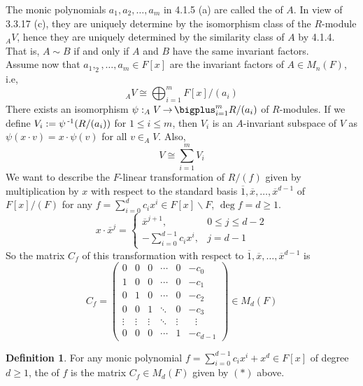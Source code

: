\documentclass[11pt]{book}
\theoremstyle{definition}   \newtheorem{defn}[counter]{Definition} %
\newcommand{\ov}{\overline}   \newcommand{\wt}{\widetilde}
\newcommand{\bs}{\backslash}   \newcommand{\A}{\mathcal{A}}   \newcommand{\sy}{\textnormal{Syl}}   \newcommand{\size}[1]{\left| #1 \right|}
\newcommand{\mymatrix}[2]{\left( \begin{array}{#1} #2 \end{array} \right)}
\DeclareMathOperator{\ra}{\rightarrow}   \DeclareMathOperator{\Poly}{\mathbf{P}}   \DeclareMathOperator{\spn}{\textnormal{span}}   \DeclareMathOperator{\aut}{\textnormal{Aut}}
\newcommand{\vs}{\vspace{8pt}}
\numberwithin{counter}{chapter}
\begin{document}
\vs

\begin{remark}[+ Definition]
The monic polynomials $a_1,a_2,\dots,a_m$ in 4.1.5 (a) are called the  of $A$. In view of 3.3.17 (c), they are uniquely determine by the isomorphism class of the $R$-module $_AV$, hence they are uniquely determined by the similarity class of $A$ by 4.1.4. That is, $A \sim B$ if and only if $A$ and $B$ have the same invariant factors. \\

Assume now that $a_1,_2,\dots,a_m \in F[x]$ are the invariant factors of $A \in M_n(F)$, i.e,
	\[_AV \cong \bigoplus_{i=1}^m F[x]/(a_i) \]
There exists an isomorphism $\psi : _AV \ra \bigplus_{i=1}^m R/(a_i)$ of $R$-modules. If we define $V_i := \psi\operatorname{^{-1}}(R/(a_i))$ for $1 \leq i \leq m$, then $V_i$ is an $A$-invariant subspace of $V$ as $\psi(x \cdot v) = x \cdot \psi(v)$ for all $v \in _AV$. Also,
	\[V \cong \sum_{i=1}^m V_i \]
We want to describe the $F$-linear transformation of $R/(f)$ given by multiplication by $x$ with respect to the standard basis $\ov{1},\ov{x},\dots,\ov{x}^{d-1}$ of $F[x]/(F)$ for any $f = \sum_{i=0}^d c_i x^i \in F[x]\bs F$, $\deg f = d \geq 1$.
	\[x \cdot \ov{x}^j = \begin{cases}
	\ov{x}^{j+1}, \quad & 0 \leq j \leq d-2 \\
	-\sum_{i=0}^{d-1} c_i x^i, & j = d-1
	\end{cases} \]
So the matrix $C_f$ of this transformation with respect to $\ov{1},\ov{x},\dots,\ov{x}^{d-1}$ is
	\[C_f = \mymatrix{cccccl}{0 & 0 & 0 & \cdots & 0 & -c_0 \\
							  1 & 0 & 0 & \cdots & 0 & -c_1 \\
							  0 & 1 & 0 & \cdots & 0 & -c_2 \\
							  0 & 0 & 1 & \ddots & 0 & -c_3 \\
							  \vdots & \vdots & \vdots & \ddots & \vdots & \ \ \ \vdots \\
							  0 & 0 & 0 & \cdots & 1 & -c_{d-1}} \in M_d(F) \tag{$\ast$}\]
\end{remark}

\vs

\begin{defn}
For any monic polynomial $f = \sum_{i=0}^{d-1} c_i x^i + x^d \in F[x]$ of degree $d \geq 1$, the  of $f$ is the matrix $C_f \in M_d(F)$ given by $(\ast)$ above.
\end{defn}

\vs
\end{document}
